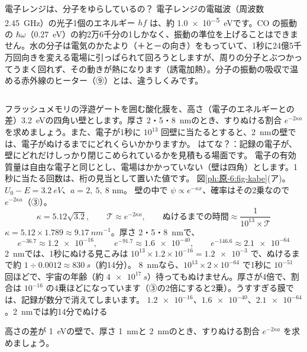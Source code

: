 \begin{column}{電子レンジは、分子をゆらしているの？}
電子レンジの電磁波（周波数 \qty{2.45}{GHz}）の光子1個のエネルギー $hf$ は、約 \qty{1.0e-5}{eV}です。CO の振動の $\hbar\omega$（\qty{0.27}{eV}）の約2万6千分の1しかなく、振動の準位を上げることはできません。水の分子は電気のかたより（＋と－の向き）をもっていて、1秒に24億5千万回向きを変える電場に引っぱられて回ろうとしますが、周りの分子とぶつかってうまく回れず、その動きが熱になります（誘電加熱）。分子の振動の吸収で温める赤外線のヒーター（⑨）とは、違うしくみです。
\end{column}

\label{ph:原-6:ex1}
\begin{phreidai}
フラッシュメモリの浮遊ゲートを囲む酸化膜を、高さ（電子のエネルギーとの差）\qty{3.2}{eV}の四角い壁とします。厚さ 2・5・\qty{8}{nm}のとき、すりぬける割合 $e^{-2\kappa a}$ を求めましょう。また、電子が1秒に $10^{13}$ 回壁に当たるとすると、\qty{2}{nm}の壁では、電子がぬけるまでにどれくらいかかりますか。
\phbamen
はてな？：記録の電子が、壁にどれだけしっかり閉じこめられているかを見積もる場面です。
\phmushi
電子の有効質量は自由な電子と同じとし、電場はかかっていない（壁は四角）とします。1秒に当たる回数は、桁の見当として置いた値です。
\phzu
図\ref{ph:原-6:fig-kabe}(ア)。$U_0-E=\qty{3.2}{eV}$、$a=2,\ 5,\ 8$ nm。
\phriyu
壁の中で $\psi\propto e^{-\kappa x}$、確率はその2乗なので $e^{-2\kappa a}$（③）。
\phtateru
\[\kappa=5.12\sqrt{3.2},\qquad \mathcal T\approx e^{-2\kappa a},\qquad \text{ぬけるまでの時間}\approx\frac{1}{10^{13}\times\mathcal T}\]
\phtoku
$\kappa=5.12\times1.789\approx\qty{9.17}{nm^{-1}}$。厚さ 2・5・\qty{8}{nm}で、
\[e^{-36.7}\approx\num{1.2e-16},\qquad e^{-91.7}\approx\num{1.6e-40},\qquad e^{-146.6}\approx\num{2.1e-64}\]
\qty{2}{nm}では、1秒にぬける見こみは $10^{13}\times1.2\times10^{-16}=\num{1.2e-3}$ で、ぬけるまで約 $1\div0.0012\approx\qty{830}{s}$（約14分）。
\phtashikame
\qty{8}{nm}なら、$10^{13}\times2\times10^{-64}$ で1秒に $10^{-51}$ 回ほどで、宇宙の年齢（約 $\qty{4e17}{s}$）待ってもぬけません。厚さが4倍で、割合は $10^{-16}$ の4乗ほどになっています（③の2倍にすると2乗）。うすすぎる膜では、記録が数分で消えてしまいます。
\kotae $\num{1.2e-16}$、$\num{1.6e-40}$、$\num{2.1e-64}$。\qty{2}{nm}では約14分でぬける
\end{phreidai}
\begin{jibun}
高さの差が \qty{1}{eV}の壁で、厚さ \qty{1}{nm}と \qty{2}{nm}のとき、すりぬける割合 $e^{-2\kappa a}$ を求めましょう。
\end{jibun}

